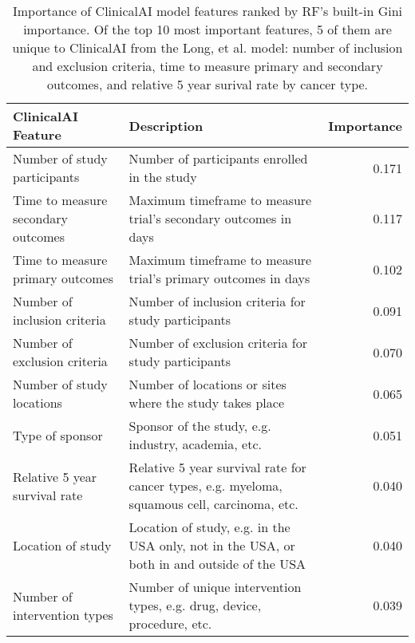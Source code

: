 \begin{table}
\caption{Importance of ClinicalAI model features ranked by RF's built-in Gini importance. Of the top 10 most important features, 5 of them are unique to ClinicalAI from the Long, et al. model: number of inclusion and exclusion criteria, time to measure primary and secondary outcomes, and relative 5 year surival rate by cancer type.}
\label{tab:feature_importance}
\begin{tabular}{llr}
\toprule
ClinicalAI Feature & Description & Importance \\
\midrule
Number of study participants & Number of participants enrolled in the study & 0.171 \\
Time to measure secondary outcomes & Maximum timeframe to measure trial's secondary outcomes in days & 0.117 \\
Time to measure primary outcomes & Maximum timeframe to measure trial's primary outcomes in days & 0.102 \\
Number of inclusion criteria & Number of inclusion criteria for study participants & 0.091 \\
Number of exclusion criteria & Number of exclusion criteria for study participants & 0.070 \\
Number of study locations & Number of locations or sites where the study takes place & 0.065 \\
Type of sponsor & Sponsor of the study, e.g. industry, academia, etc. & 0.051 \\
Relative 5 year survival rate & Relative 5 year survival rate for cancer types, e.g. myeloma, squamous cell, carcinoma, etc. & 0.040 \\
Location of study & Location of study, e.g. in the USA only, not in the USA, or both in and outside of the USA & 0.040 \\
Number of intervention types & Number of unique intervention types, e.g. drug, device, procedure, etc. & 0.039 \\
\bottomrule
\end{tabular}
\end{table}

